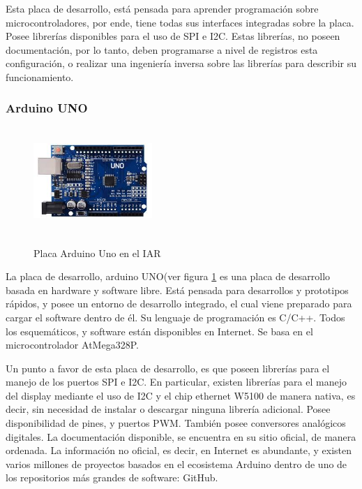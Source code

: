 Esta placa de desarrollo, está pensada para aprender programación sobre microcontroladores, por ende, tiene todas sus interfaces integradas sobre la placa. Posee librerías disponibles para el uso de SPI e I2C. Estas librerías, no poseen documentación, por lo tanto, deben programarse a nivel de registros esta configuración, o realizar una ingeniería inversa sobre las librerías para describir su funcionamiento.    
\vspace{-3mm}
 
\subsubsection{Arduino UNO }
\vspace{-5mm}
\begin{figure}
	\caption{Placa Arduino Uno en el IAR}
	\includegraphics[width=0.4\textwidth , height=  40mm]{arduino_uno}
	\label{fig:arduino_uno}	
\end{figure}




La placa de desarrollo, arduino UNO(ver figura \ref{fig:arduino_uno} es una placa de desarrollo basada en hardware y software libre. Está pensada para desarrollos y prototipos rápidos, y posee un entorno de desarrollo integrado, el cual viene preparado para cargar el software dentro de él. Su lenguaje de programación es C/C++. Todos los esquemáticos, y software están disponibles en Internet. Se basa en el microcontrolador AtMega328P.  

Un punto a favor de esta placa de desarrollo, es que poseen librerías para el manejo de los puertos SPI e I2C. En particular, existen librerías para el manejo del display mediante el uso de I2C y el chip ethernet W5100 de manera nativa, es decir, sin necesidad de instalar o descargar ninguna librería adicional. Posee disponibilidad de pines,  y puertos PWM. También posee conversores analógicos digitales. La documentación disponible, se encuentra en su sitio oficial, de manera ordenada. 
La información no oficial, es decir, en Internet es abundante, y existen varios millones de proyectos basados en el ecosistema Arduino dentro de uno de los repositorios más grandes de software: GitHub.    

